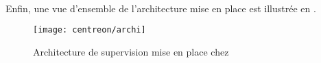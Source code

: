 \paragraph{}
Enfin, une vue d'ensemble de l'architecture mise en place est illustrée en .

\begin{figure}
	\centering
	\texttt{[image: centreon/archi]}
	\caption{Architecture de supervision mise en place chez \adacast{}}
	\label{figure:centreon:archi}
\end{figure}

